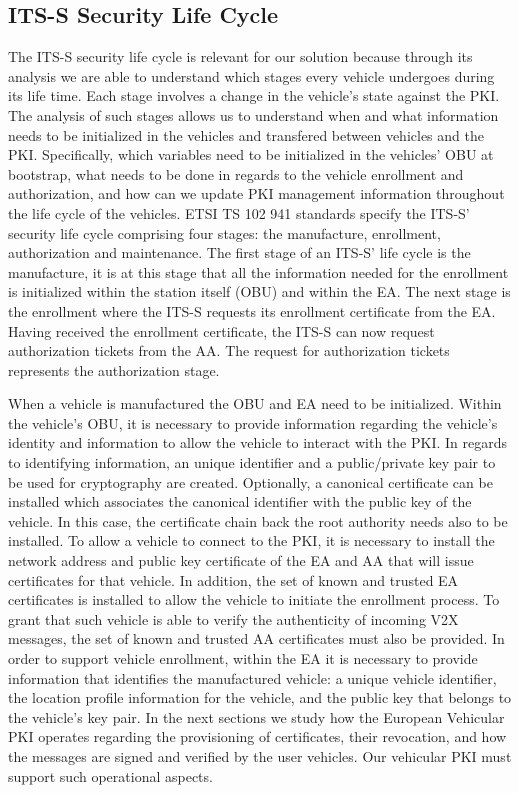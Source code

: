 \subsection{ITS-S Security Life Cycle}
\label{section:life-cycle}

The ITS-S security life cycle is relevant for our solution because through its analysis we are able to understand which stages every vehicle undergoes during its life time. Each stage involves a change in the vehicle's state against the PKI. The analysis of such stages allows us to understand when and what information needs to be initialized in the vehicles and transfered between vehicles and the PKI. Specifically, which variables need to be initialized in the vehicles’ OBU at bootstrap, what needs to be done in regards to the vehicle enrollment and authorization, and how can we update PKI management information throughout the life cycle of the vehicles.
ETSI TS 102 941 \cite{etsi_privacy} standards specify the ITS-S' security life cycle comprising four stages: the manufacture, enrollment, authorization and maintenance. The first stage of an ITS-S' life cycle is the manufacture, it is at this stage that all the information needed for the enrollment is initialized within the station itself (OBU) and within the EA. The next stage is the enrollment where the ITS-S requests its enrollment certificate from the EA. Having received the enrollment certificate, the ITS-S can now request authorization tickets from the AA. The request for authorization tickets represents the authorization stage. 

When a vehicle is manufactured the OBU and EA need to be initialized. Within the vehicle's OBU, it is necessary to provide information regarding the vehicle's identity and information to allow the vehicle to interact with the PKI. In regards to identifying information, an unique identifier and a public\slash private key pair to be used for cryptography are created. Optionally, a canonical certificate can be installed which associates the canonical identifier with the public key of the vehicle. In this case, the certificate chain back the root authority needs also to be installed. To allow a vehicle to connect to the PKI, it is necessary to install the network address and public key certificate of the EA and AA that will issue certificates for that vehicle. In addition, the set of known and trusted EA certificates is installed to allow the vehicle to initiate the enrollment process. To grant that such vehicle is able to verify the authenticity of incoming V2X messages, the set of known and trusted AA certificates must also be provided. In order to support vehicle enrollment, within the EA it is necessary to provide information that identifies the manufactured vehicle: a unique vehicle identifier, the location profile information for the vehicle, and the public key that belongs to the vehicle's key pair. In the next sections we study how the European Vehicular PKI operates regarding the provisioning of certificates, their revocation, and how the messages are signed and verified by the user vehicles. Our vehicular PKI must support such operational aspects.

